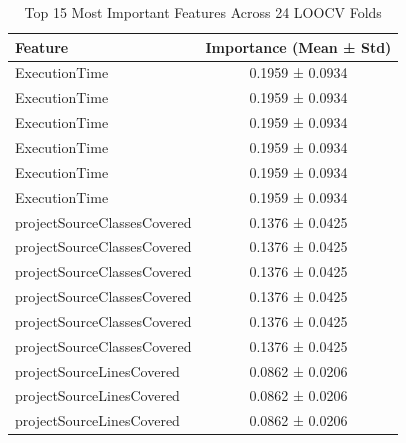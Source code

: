 \begin{table}
\caption{Top 15 Most Important Features Across 24 LOOCV Folds}
\label{tab:top15_features}
\begin{tabular}{lc}
\toprule
Feature & Importance (Mean ± Std) \\
\midrule
ExecutionTime & 0.1959 ± 0.0934 \\
ExecutionTime & 0.1959 ± 0.0934 \\
ExecutionTime & 0.1959 ± 0.0934 \\
ExecutionTime & 0.1959 ± 0.0934 \\
ExecutionTime & 0.1959 ± 0.0934 \\
ExecutionTime & 0.1959 ± 0.0934 \\
projectSourceClassesCovered & 0.1376 ± 0.0425 \\
projectSourceClassesCovered & 0.1376 ± 0.0425 \\
projectSourceClassesCovered & 0.1376 ± 0.0425 \\
projectSourceClassesCovered & 0.1376 ± 0.0425 \\
projectSourceClassesCovered & 0.1376 ± 0.0425 \\
projectSourceClassesCovered & 0.1376 ± 0.0425 \\
projectSourceLinesCovered & 0.0862 ± 0.0206 \\
projectSourceLinesCovered & 0.0862 ± 0.0206 \\
projectSourceLinesCovered & 0.0862 ± 0.0206 \\
\bottomrule
\end{tabular}
\end{table}

